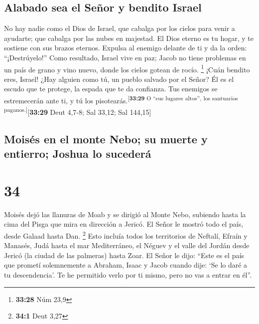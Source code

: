 \hypertarget{alabado-sea-el-seuxf1or-y-bendito-israel}{%
\subsection{Alabado sea el Señor y bendito
Israel}\label{alabado-sea-el-seuxf1or-y-bendito-israel}}

 No hay nadie como el Dios de Israel, que cabalga por los
cielos para venir a ayudarte; que cabalga por las nubes en majestad.
 El Dios eterno es tu hogar, y te sostiene con sus brazos
eternos. Expulsa al enemigo delante de ti y da la orden:
``¡Destrúyelo!''  Como resultado, Israel vive en paz;
Jacob no tiene problemas en un país de grano y vino nuevo, donde los
cielos gotean de rocío. \footnote{\textbf{33:28} Núm 23,9}
 ¡Cuán bendito eres, Israel! ¿Hay alguien como tú, un
pueblo salvado por el Señor? Él es el escudo que te protege, la espada
que te da confianza. Tus enemigos se estremecerán ante ti, y tú los
pisotearás.\textsuperscript{{[}\textbf{33:29} O ``sus lugares altos'',
los santuarios paganos.{]}}{[}\textbf{33:29} Deut 4,7-8; Sal 33,12; Sal
144,15{]}

\hypertarget{moisuxe9s-en-el-monte-nebo-su-muerte-y-entierro-joshua-lo-sucederuxe1}{%
\subsection{Moisés en el monte Nebo; su muerte y entierro; Joshua lo
sucederá}\label{moisuxe9s-en-el-monte-nebo-su-muerte-y-entierro-joshua-lo-sucederuxe1}}

\hypertarget{section-33}{%
\section{34}\label{section-33}}

 Moisés dejó las llanuras de Moab y se dirigió al Monte
Nebo, subiendo hasta la cima del Pisga que mira en dirección a Jericó.
El Señor le mostró todo el país, desde Galaad hasta Dan. \footnote{\textbf{34:1}
  Deut 3,27}  Esto incluía todos los territorios de
Neftalí, Efraín y Manasés, Judá hasta el mar Mediterráneo,
 el Néguev y el valle del Jordán desde Jericó (la ciudad
de las palmeras) hasta Zoar.  El Señor le dijo: ``Este es
el país que prometí solemnemente a Abraham, Isaac y Jacob cuando dije:
`Se lo daré a tu descendencia'. Te he permitido verlo por ti mismo, pero
no vas a entrar en él''.

